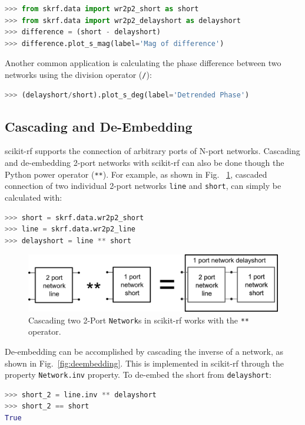 \documentclass[10pt, letterpaper]{scrartcl}
\newcommand{\skrf}{{s}cikit-rf\xspace}
\begin{document}
\begin{lstlisting}[language=Python]
>>> from skrf.data import wr2p2_short as short
>>> from skrf.data import wr2p2_delayshort as delayshort
>>> difference = (short - delayshort)
>>> difference.plot_s_mag(label='Mag of difference')
\end{lstlisting}

Another common application is calculating the phase difference between two networks using the division operator (\texttt{/}):

\begin{lstlisting}[language=Python]
>>> (delayshort/short).plot_s_deg(label='Detrended Phase')
\end{lstlisting}

\subsection{Cascading and De-Embedding}
\skrf{} supports the connection of arbitrary ports of N-port networks. Cascading and de-embedding 2-port networks with \skrf{} can also be done though the Python power operator (\texttt{**}). For example, as shown in Fig. ~\ref{fig:cascading}, cascaded connection of two individual 2-port networks \texttt{line} and \texttt{short}, can simply be calculated with:

\begin{lstlisting}[language=Python]
>>> short = skrf.data.wr2p2_short
>>> line = skrf.data.wr2p2_line
>>> delayshort = line ** short
\end{lstlisting}

\begin{figure}
	\centering
	\includegraphics[width=0.7\linewidth]{figures/cascading.png}
	\caption{Cascading two 2-Port \texttt{Network}s in \skrf{} works with the \texttt{**} operator.}
	\label{fig:cascading}
\end{figure}

De-embedding can be accomplished by cascading the inverse of a network, as shown in Fig.~\ref{fig:deembedding}. This is implemented in \skrf{} through the property \texttt{Network.inv} property. To de-embed the short from \texttt{delayshort}:

\begin{lstlisting}[language=Python]
>>> short_2 = line.inv ** delayshort
>>> short_2 == short
True
\end{lstlisting}
\end{document}
